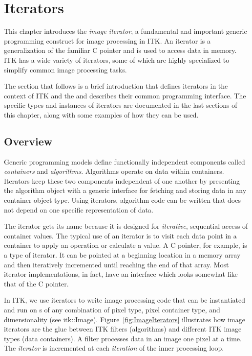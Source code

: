 \chapter{Iterators}

This chapter introduces the \emph{image iterator}, a fundamental and important
generic programming construct for image processing in ITK.  An iterator is a
generalization of the familiar C pointer and is used to access data in memory.  ITK
has a wide variety of iterators, some of which are highly specialized to
simplify common image processing tasks.

The section that follows is a brief introduction that defines iterators in the
context of ITK and the  and describes their common programming
interface.  The specific types and instances of iterators are documented in the
last sections of this chapter, along with some examples of how they can be
used.

\section{Overview}
\label{sec:IteratorsIntroduction}
Generic programming models define functionally independent components called
\emph{containers} and \emph{algorithms}.  Algorithms operate on data
within containers.  Iterators keep these two components independent of one
another by presenting the algorithm object with a generic interface for
fetching and storing data in any container object type.  Using iterators,
algorithm code can be written that does not depend on one specific
representation of data.

The iterator gets its name because it is designed for \emph{iterative},
sequential access of container values.  The typical use of an iterator is to
visit each data point in a container to apply an operation or calculate a
value.  A C pointer, for example, is a type of iterator.  It can be pointed at
a beginning location in a memory array and then iteratively incremented until
reaching the end of that array.  Most iterator implementations, in fact, have
an interface which looks somewhat like that of the C pointer.

In ITK, we use iterators to write image processing code that can be
instantiated and run on s of any combination of pixel type,
pixel container type, and dimensionality (see itk::Image).
Figure~\ref{fig:ImageIterators} illustrates how image iterators are the glue
between ITK filters (algorithms) and different ITK image types (data
containers). A filter processes data in an image one pixel at a time.  The
\emph{iterator} is incremented at each \emph{iteration} of the inner processing
loop.  

